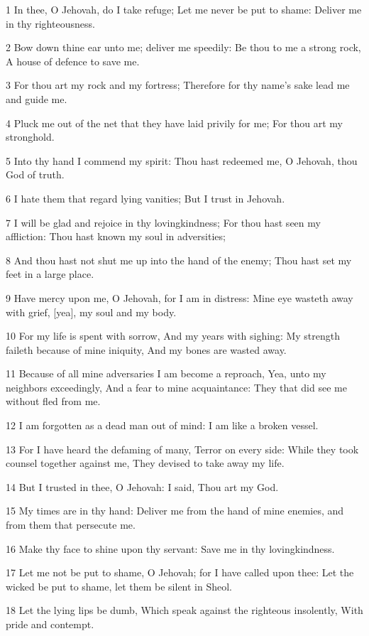 \par 1 In thee, O Jehovah, do I take refuge; Let me never be put to shame: Deliver me in thy righteousness.
\par 2 Bow down thine ear unto me; deliver me speedily: Be thou to me a strong rock, A house of defence to save me.
\par 3 For thou art my rock and my fortress; Therefore for thy name's sake lead me and guide me.
\par 4 Pluck me out of the net that they have laid privily for me; For thou art my stronghold.
\par 5 Into thy hand I commend my spirit: Thou hast redeemed me, O Jehovah, thou God of truth.
\par 6 I hate them that regard lying vanities; But I trust in Jehovah.
\par 7 I will be glad and rejoice in thy lovingkindness; For thou hast seen my affliction: Thou hast known my soul in adversities;
\par 8 And thou hast not shut me up into the hand of the enemy; Thou hast set my feet in a large place.
\par 9 Have mercy upon me, O Jehovah, for I am in distress: Mine eye wasteth away with grief, [yea], my soul and my body.
\par 10 For my life is spent with sorrow, And my years with sighing: My strength faileth because of mine iniquity, And my bones are wasted away.
\par 11 Because of all mine adversaries I am become a reproach, Yea, unto my neighbors exceedingly, And a fear to mine acquaintance: They that did see me without fled from me.
\par 12 I am forgotten as a dead man out of mind: I am like a broken vessel.
\par 13 For I have heard the defaming of many, Terror on every side: While they took counsel together against me, They devised to take away my life.
\par 14 But I trusted in thee, O Jehovah: I said, Thou art my God.
\par 15 My times are in thy hand: Deliver me from the hand of mine enemies, and from them that persecute me.
\par 16 Make thy face to shine upon thy servant: Save me in thy lovingkindness.
\par 17 Let me not be put to shame, O Jehovah; for I have called upon thee: Let the wicked be put to shame, let them be silent in Sheol.
\par 18 Let the lying lips be dumb, Which speak against the righteous insolently, With pride and contempt.
